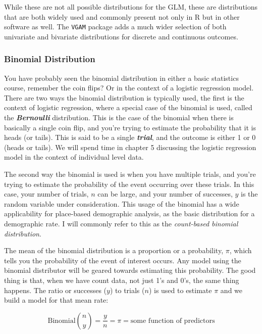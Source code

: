 \documentclass[
]{article}
\begin{document}
While these are not all possible distributions for the GLM, these are distributions that are both widely used and commonly present not only in R but in other software as well. The \texttt{VGAM} package adds a much wider selection of both univariate and bivariate distributions for discrete and continuous outcomes.

\hypertarget{binomial-distribution}{%
\subsubsection{Binomial Distribution}\label{binomial-distribution}}

You have probably seen the binomial distribution in either a basic statistics course, remember the coin flips? Or in the context of a logistic regression model. There are two ways the binomial distribution is typically used, the first is the context of logistic regression, where a special case of the binomial is used, called the \textbf{\emph{Bernoulli}} distribution. This is the case of the binomial when there is basically a single coin flip, and you're trying to estimate the probability that it is heads (or tails). This is said to be a single \textbf{\emph{trial}}, and the outcome is either 1 or 0 (heads or tails). We will spend time in chapter 5 discussing the logistic regression model in the context of individual level data.

The second way the binomial is used is when you have multiple trials, and you're trying to estimate the probability of the event occurring over these trials. In this case, your number of trials, \(n\) can be large, and your number of successes, \(y\) is the random variable under consideration. This usage of the binomial has a wide applicability for place-based demographic analysis, as the basic distribution for a demographic rate. I will commonly refer to this as the \emph{count-based binomial distribution}.

The mean of the binomial distribution is a proportion or a probability, \(\pi\), which tells you the probability of the event of interest occurs. Any model using the binomial distributor will be geared towards estimating this probability. The good thing is that, when we have count data, not just 1's and 0's, the same thing happens. The ratio or successes (\(y\)) to trials (\(n\)) is used to estimate \(\pi\) and we build a model for that mean rate:

\[\text{Binomial} \binom{n}{y} = \frac{y}{n} = \pi = \text{some function of predictors}\]
\end{document}
